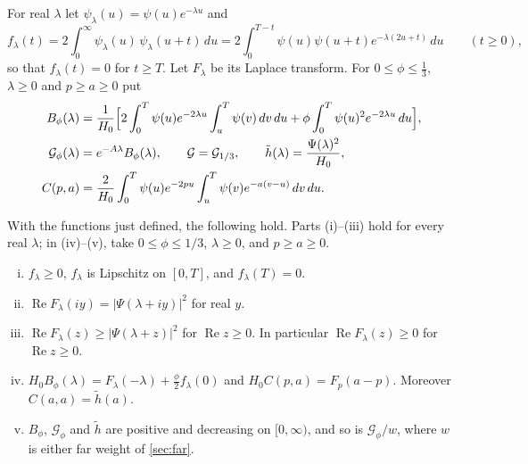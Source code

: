 \documentclass[11pt]{amsart}
\numberwithin{equation}{section}
\theoremstyle{plain}
\theoremstyle{definition}
\theoremstyle{remark}
\renewcommand{\Re}{\operatorname{Re}}
\newcommand{\1}{\mathbf{1}}
\begin{document}
For real $\lambda$ let $\psi_\lambda(u)=\psi(u)e^{-\lambda u}$ and
\[
  f_\lambda(t)=2\int_0^\infty\psi_\lambda(u)\,\psi_\lambda(u+t)\,du
  =2\int_0^{T-t}\psi(u)\psi(u+t)e^{-\lambda(2u+t)}\,du\qquad(t\ge0),
\]
so that $f_\lambda(t)=0$ for $t\ge T$. Let $F_\lambda$ be its Laplace transform. For
$0\le\phi\le\frac13$, $\lambda\ge0$ and $p\ge a\ge0$ put
\begin{align*}
  B_\phi(\lambda)&=\frac1{H_0}\Bigl[2\int_0^T\psi(u)e^{-2\lambda u}\int_u^T\psi(v)\,dv\,du
    +\phi\int_0^T\psi(u)^2e^{-2\lambda u}\,du\Bigr],\\
  \mathcal G_\phi(\lambda)&=e^{-A\lambda}B_\phi(\lambda),\qquad \mathcal G=\mathcal G_{1/3},\qquad
  \tilde h(\lambda)=\frac{\Psi(\lambda)^2}{H_0},\\
  C(p,a)&=\frac2{H_0}\int_0^T\psi(u)e^{-2pu}\int_u^T\psi(v)e^{-a(v-u)}\,dv\,du .
\end{align*}

\begin{lemma}\label{lem:envelope}
With the functions just defined, the following hold. Parts (i)--(iii) hold for every
real $\lambda$; in (iv)--(v), take $0\le\phi\le1/3$, $\lambda\ge0$, and $p\ge a\ge0$.
\begin{enumerate}[(i)]
  \item $f_\lambda\ge0$, $f_\lambda$ is Lipschitz on $[0,T]$, and $f_\lambda(T)=0$.
  \item $\Re F_\lambda(iy)=|\Psi(\lambda+iy)|^2$ for real $y$.
  \item $\Re F_\lambda(z)\ge|\Psi(\lambda+z)|^2$ for $\Re z\ge0$. In particular $\Re F_\lambda(z)\ge0$
    for $\Re z\ge0$.
  \item $H_0B_\phi(\lambda)=F_\lambda(-\lambda)+\frac\phi2f_\lambda(0)$ and
    $H_0C(p,a)=F_p(a-p)$. Moreover $C(a,a)=\tilde h(a)$.
  \item $B_\phi$, $\mathcal G_\phi$ and $\tilde h$ are positive and decreasing on $[0,\infty)$, and so is
    $\mathcal G_\phi/w$, where $w$ is either far weight of \cref{sec:far}.
\end{enumerate}
\end{lemma}
\end{document}
